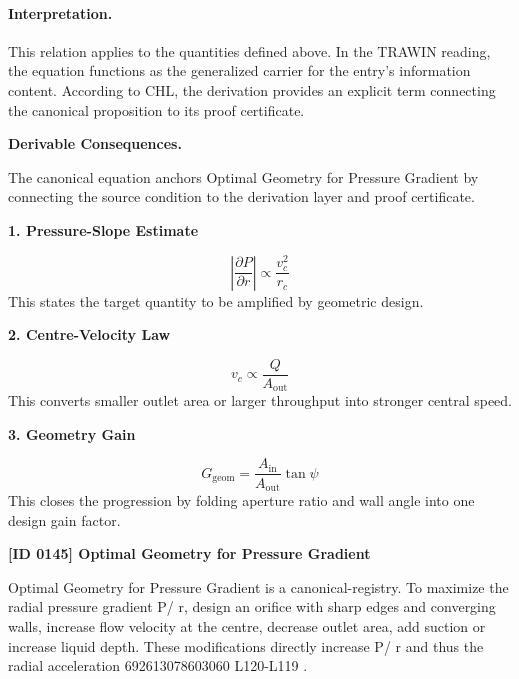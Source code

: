 \paragraph{Interpretation.}
This relation applies to the quantities defined above. In the TRAWIN reading, the equation functions as the generalized carrier for the entry’s information content. According to CHL, the derivation provides an explicit term connecting the canonical proposition to its proof certificate.

\par\vspace{0.35em}
\noindent\textbf{Derivable Consequences.}\quad
\begingroup
\footnotesize
\raggedright
The canonical equation anchors Optimal Geometry for Pressure Gradient by connecting the source condition to the derivation layer and proof certificate.
\par\endgroup

\noindent\textbf{1. Pressure-Slope Estimate}\par
\[
\left|\frac{\partial P}{\partial r}\right|\propto \frac{v_c^2}{r_c}
\]
\noindent This states the target quantity to be amplified by geometric design.\par
\noindent\textbf{2. Centre-Velocity Law}\par
\[
v_c\propto \frac{Q}{A_{\mathrm{out}}}
\]
\noindent This converts smaller outlet area or larger throughput into stronger central speed.\par
\noindent\textbf{3. Geometry Gain}\par
\[
G_{\mathrm{geom}}=\frac{A_{\mathrm{in}}}{A_{\mathrm{out}}}\tan\psi
\]
\noindent This closes the progression by folding aperture ratio and wall angle into one design gain factor.\par

\clearpage
\noindent\textbf{[ID 0145] Optimal Geometry for Pressure Gradient}\par
\vspace{0.35em}
\begingroup\small
{}
Optimal Geometry for Pressure Gradient is a canonical-registry. To maximize the radial pressure gradient  P/ r, design an orifice with sharp edges and converging walls, increase flow velocity at the centre, decrease outlet area, add suction or increase liquid depth. These modifications directly increase  P/ r and thus the radial acceleration 692613078603060 L120-L119 .

